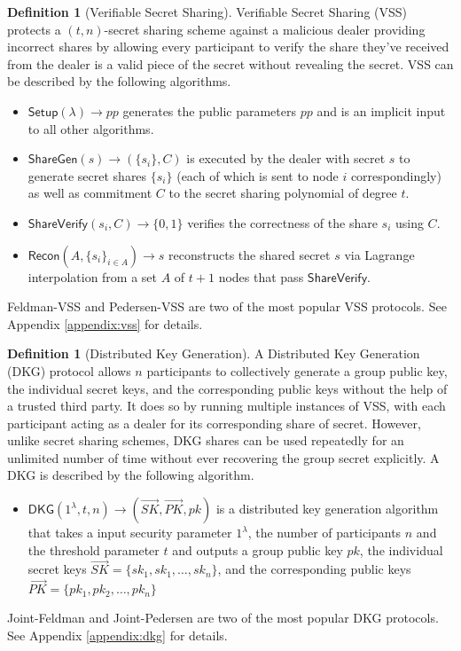 \documentclass[letterpaper,twocolumn,10pt]{article}
\theoremstyle{definition}
\newtheorem{definition}[theorem]{Definition}
\theoremstyle{remark}
\begin{document}
\begin{definition}[Verifiable Secret Sharing]
Verifiable Secret Sharing (VSS) \cite{feldman1987practical, pedersen1991non} protects a $(t, n)$-secret sharing scheme against a malicious dealer providing incorrect shares by allowing every participant to verify the share they've received from the dealer is a valid piece of the secret without revealing the secret. VSS can be described by the following algorithms.
\begin{itemize}
    \item $\mathsf{Setup}(\lambda) \rightarrow pp$ generates the public parameters $pp$ and is an implicit input to all other algorithms.
    \item $\mathsf{ShareGen}(s) \rightarrow (\{s_i\}, C)$ is executed by the dealer with secret $s$ to generate secret shares $\{s_i\}$ (each of which is sent to node $i$ correspondingly) as well as commitment $C$ to the secret sharing polynomial of degree $t$.
    \item $\mathsf{ShareVerify}(s_i, C) \rightarrow \{0, 1\}$ verifies the correctness of the share $s_i$ using $C$.
    \item $\mathsf{Recon}(A, \{s_i\}_{i \in A}) \rightarrow s$ reconstructs the shared secret $s$ via Lagrange interpolation from a set $A$ of $t + 1$ nodes that pass $\mathsf{ShareVerify}$.
\end{itemize}
Feldman-VSS and Pedersen-VSS are two of the most popular VSS protocols. See Appendix \ref{appendix:vss} for details.
\end{definition}

\begin{definition}[Distributed Key Generation]
A Distributed Key Generation (DKG) \cite{gennaro1999secure, gennaro3revisiting} protocol allows $n$ participants to collectively generate a group public key, the individual secret keys, and the corresponding public keys without the help of a trusted third party. It does so by running multiple instances of VSS, with each participant acting as a dealer for its corresponding share of secret. However, unlike secret sharing schemes, DKG shares can be used repeatedly for an unlimited number of time without ever recovering the group secret explicitly. A DKG is described by the following algorithm.
\begin{itemize}
    \item $\mathsf{DKG}(1^{\lambda}, t, n) \rightarrow (\vec{SK}, \vec{PK}, pk)$ is a distributed key generation algorithm that takes a input security parameter $1^\lambda$, the number of participants $n$ and the threshold parameter $t$ and outputs a group public key $pk$, the individual secret keys $\vec{SK} = \{sk_1, sk_1, \ldots, sk_n\}$, and the corresponding public keys $\vec{PK} = \{pk_1, pk_2, \ldots, pk_n\}$
\end{itemize}
Joint-Feldman and Joint-Pedersen are two of the most popular DKG protocols. See Appendix \ref{appendix:dkg} for details.
\end{definition}
\end{document}
